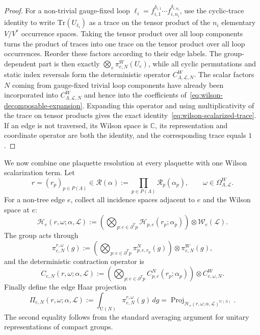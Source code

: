 \documentclass[11pt,a4paper,reqno]{article}
\theoremstyle{definition}
\theoremstyle{remark}
\newcommand\U{{\mathrm U}}
\newcommand\C{\mathbb{C}}
\newcommand\Tr{\mathrm{Tr}}
\newcommand\Lc{{\mathcal{L}}}
\begin{document}
\begin{proof}
For a non-trivial gauge-fixed loop $\ell_i=f_{i,1}^{\delta_{i,1}}\cdots f_{i,n_i}^{\delta_{i,n_i}}$, use the cyclic-trace identity to write $\Tr(U_{\ell_i})$ as a trace on the tensor product of the $n_i$ elementary $V/V^*$ occurrence spaces. Taking the tensor product over all loop components turns the product of traces into one trace on the tensor product over all loop occurrences. Reorder these factors according to their edge labels. The group-dependent part is then exactly $\bigotimes_e\pi^W_{e,N}(U_e)$, while all cyclic permutations and static index reversals form the deterministic operator $C^W_{\Lambda,\Lc,N}$. The scalar factors $N$ coming from gauge-fixed trivial loop components have already been incorporated into $C^W_{\Lambda,\Lc,N}$ and hence into the coefficients of~\eqref{eq:wilson-decomposable-expansion}. Expanding this operator and using multiplicativity of the trace on tensor products gives the exact identity~\eqref{eq:wilson-scalarized-trace}. If an edge is not traversed, its Wilson space is $\C$, its representation and coordinate operator are both the identity, and the corresponding trace equals $1$.
\end{proof}

We now combine one plaquette resolution at every plaquette with one Wilson scalarization term. Let
\[
r=(r_p)_{p\in P(\Lambda)}\in
\mathcal R(\alpha):=\prod_{p\in P(\Lambda)}\mathcal R_p(\alpha_p),
\qquad \omega\in\Omega^W_{\Lambda,\Lc}.
\]
For a non-tree edge $e$, collect all incidence spaces adjacent to $e$ and the Wilson space at $e$:
\begin{equation}\label{eq:edge-hilbert-space}
\mathcal H_e(r,\omega;\alpha,\Lc)
:=\left(\bigotimes_{p:e\in\partial^Tp}\mathcal H_{p,e}(r_p;\alpha_p)\right)
\otimes\mathcal W_e(\Lc).
\end{equation}
The group acts through
\begin{equation}\label{eq:edge-representation}
\pi^{r,\omega}_{e,N}(g)
:=\left(\bigotimes_{p:e\in\partial^Tp}\pi^N_{p,e,r_p}(g)\right)
\otimes\pi^W_{e,N}(g),
\end{equation}
and the deterministic contraction operator is
\begin{equation}\label{eq:edge-contraction-operator}
C_{e,N}(r,\omega;\alpha,\Lc)
:=\left(\bigotimes_{p:e\in\partial^Tp}C^N_{p,e}(r_p;\alpha_p)\right)
\otimes C^W_{e,\omega,N}.
\end{equation}
Finally define the edge Haar projection
\begin{equation}\label{eq:edge-haar-projection}
\Pi_{e,N}(r,\omega;\alpha,\Lc)
:=\int_{\U(N)}\pi^{r,\omega}_{e,N}(g)\,dg
=\operatorname{Proj}_{\mathcal H_e(r,\omega;\alpha,\Lc)^{\U(N)}}.
\end{equation}
The second equality follows from the standard averaging argument for unitary representations of compact groups.
\end{document}
